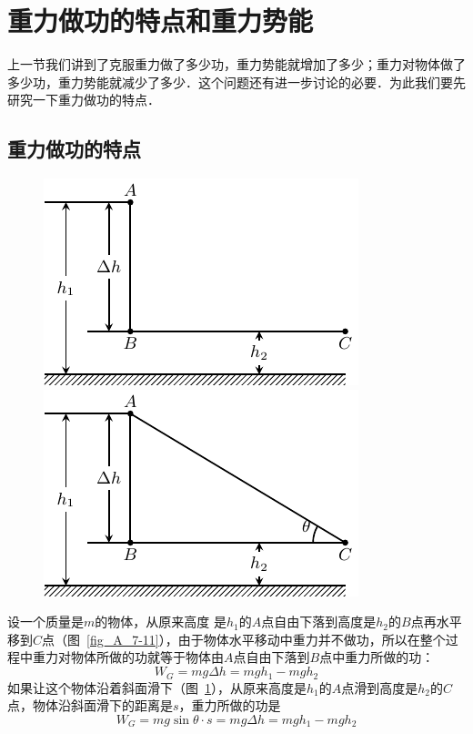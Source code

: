 \section{重力做功的特点和重力势能}
上一节我们讲到了克服重力做了多少功，重力势能就增加了多少；重力对物体做了多少功，重力势能就减少了多少．这个问题还有进一步讨论的必要．为此我们要先研究一下重力做功的特点．

\subsection{重力做功的特点}
\begin{figure}[htbp]
    \centering
    \begin{minipage}[b]{0.48\linewidth}
    	\centering
    	\includegraphics{fig/A/7-11.pdf}
    	\caption{}\label{fig_A_7-11}
    \end{minipage}
    \begin{minipage}[b]{0.48\linewidth}
    	\centering
    	\includegraphics{fig/A/7-12.pdf}
    	\caption{}\label{fig_A_7-12}
    \end{minipage}
\end{figure}

设一个质量是$m$的物体，从原来高度
是$h_1$的$A$点自由下落到高度是$h_2$的$B$点再水平移到$C$点（图~\ref{fig_A_7-11}），由于物体水平移动中重力并不做功，所以在整个过程中重力对物体所做的功就等于物体由$A$点自由下落到$B$点中重力所做的功：
\[W_G=mg\Delta h=mgh_1-mgh_2\]
如果让这个物体沿着斜面滑下（图~\ref{fig_A_7-12}），从原来高度是$h_1$的$A$点滑到高度是$h_2$的$C$点，物体沿斜面滑下的距离是$s$，重力所做的功是
\[W_G=mg\sin\theta \cdot s=mg\Delta h=mgh_1-mgh_2\]




